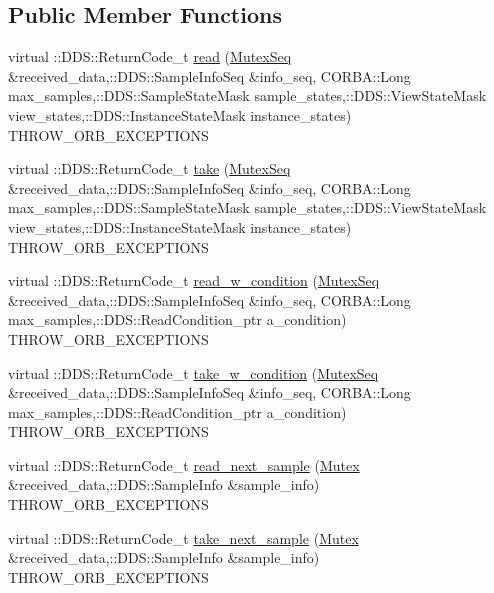 \subsection*{Public Member Functions}
\begin{DoxyCompactItemize}
\item 
virtual ::DDS::ReturnCode\_\-t \hyperlink{classKnowledge_1_1MutexDataReader__impl_aad64ea5f34fcdb289321ef48a5662aa3}{read} (\hyperlink{namespaceKnowledge_a3165529aa87299c6a92754fbd7eeeff4}{MutexSeq} \&received\_\-data,::DDS::SampleInfoSeq \&info\_\-seq, CORBA::Long max\_\-samples,::DDS::SampleStateMask sample\_\-states,::DDS::ViewStateMask view\_\-states,::DDS::InstanceStateMask instance\_\-states) THROW\_\-ORB\_\-EXCEPTIONS
\item 
virtual ::DDS::ReturnCode\_\-t \hyperlink{classKnowledge_1_1MutexDataReader__impl_a56351f04678106097939935c6c7c5b03}{take} (\hyperlink{namespaceKnowledge_a3165529aa87299c6a92754fbd7eeeff4}{MutexSeq} \&received\_\-data,::DDS::SampleInfoSeq \&info\_\-seq, CORBA::Long max\_\-samples,::DDS::SampleStateMask sample\_\-states,::DDS::ViewStateMask view\_\-states,::DDS::InstanceStateMask instance\_\-states) THROW\_\-ORB\_\-EXCEPTIONS
\item 
virtual ::DDS::ReturnCode\_\-t \hyperlink{classKnowledge_1_1MutexDataReader__impl_a59f71b699062543c82dfd8cafabdace0}{read\_\-w\_\-condition} (\hyperlink{namespaceKnowledge_a3165529aa87299c6a92754fbd7eeeff4}{MutexSeq} \&received\_\-data,::DDS::SampleInfoSeq \&info\_\-seq, CORBA::Long max\_\-samples,::DDS::ReadCondition\_\-ptr a\_\-condition) THROW\_\-ORB\_\-EXCEPTIONS
\item 
virtual ::DDS::ReturnCode\_\-t \hyperlink{classKnowledge_1_1MutexDataReader__impl_a5bd30410cb1c44b6e46a804e2ad917cd}{take\_\-w\_\-condition} (\hyperlink{namespaceKnowledge_a3165529aa87299c6a92754fbd7eeeff4}{MutexSeq} \&received\_\-data,::DDS::SampleInfoSeq \&info\_\-seq, CORBA::Long max\_\-samples,::DDS::ReadCondition\_\-ptr a\_\-condition) THROW\_\-ORB\_\-EXCEPTIONS
\item 
virtual ::DDS::ReturnCode\_\-t \hyperlink{classKnowledge_1_1MutexDataReader__impl_a92b2ac5f17d328b20ba738165792da34}{read\_\-next\_\-sample} (\hyperlink{structKnowledge_1_1Mutex}{Mutex} \&received\_\-data,::DDS::SampleInfo \&sample\_\-info) THROW\_\-ORB\_\-EXCEPTIONS
\item 
virtual ::DDS::ReturnCode\_\-t \hyperlink{classKnowledge_1_1MutexDataReader__impl_adcbeeaf99e20067861c6cf6dc0b5f024}{take\_\-next\_\-sample} (\hyperlink{structKnowledge_1_1Mutex}{Mutex} \&received\_\-data,::DDS::SampleInfo \&sample\_\-info) THROW\_\-ORB\_\-EXCEPTIONS

\end{DoxyCompactItemize}
